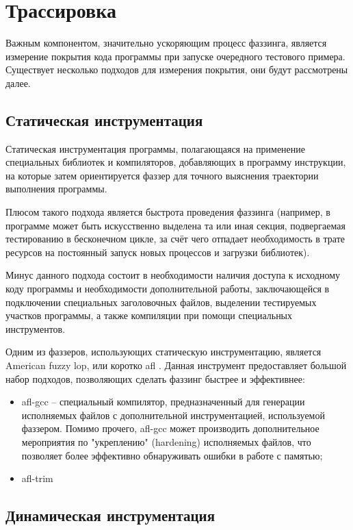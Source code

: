 \newpage
\section{Трассировка}

Важным компонентом, значительно ускоряющим процесс фаззинга, является измерение покрытия кода программы при запуске очередного тестового примера. Существует несколько подходов для измерения покрытия, они будут рассмотрены далее.


\subsection{Статическая инструментация}

Статическая инструментация программы, полагающаяся на применение специальных библиотек и компиляторов, добавляющих в программу инструкции, на которые затем ориентируется фаззер для точного выяснения траектории выполнения программы.

Плюсом такого подхода является быстрота проведения фаззинга (например, в программе может быть искусственно выделена та или иная секция, подвергаемая тестированию в бесконечном цикле, за счёт чего отпадает необходимость в трате ресурсов на постоянный запуск новых процессов и загрузки библиотек).

Минус данного подхода состоит в необходимости наличия доступа к исходному коду программы и необходимости дополнительной работы, заключающейся в подключении специальных заголовочных файлов, выделении тестируемых участков программы, а также компиляции при помощи специальных инструментов.

Одним из фаззеров, использующих статическую инструментацию, является American fuzzy lop, или коротко afl \cite{afl}. Данная инструмент предоставляет большой набор подходов, позволяющих сделать фаззинг быстрее и эффективнее:

\begin{itemize}
	\item afl-gcc -- специальный компилятор, предназначенный для генерации исполняемых файлов с дополнительной инструментацией, используемой фаззером. Помимо прочего, afl-gcc может производить дополнительное мероприятия по "укреплению" (hardening) исполняемых файлов, что позволяет более эффективно обнаруживать ошибки в работе с памятью; 
	\item afl-trim %
\end{itemize}

\subsection{Динамическая инструментация}

